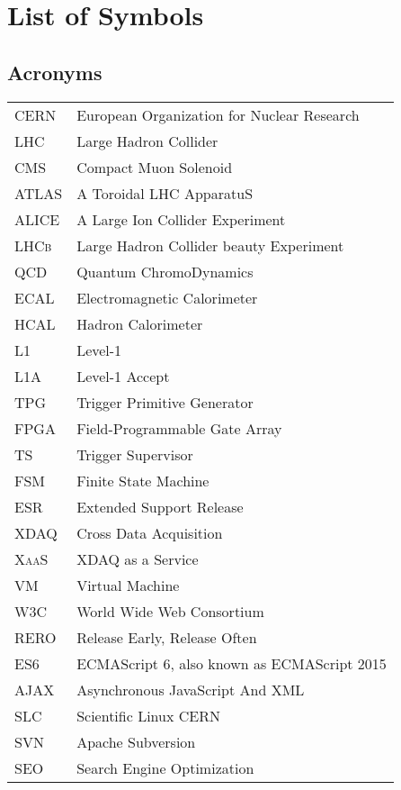 \chapter*{List of Symbols}





\section*{Acronyms}

\begin{longtable}{ll}
\textsc{CERN}	& European Organization for Nuclear Research\\
\textsc{LHC}	& Large Hadron Collider\\
\textsc{CMS}	& Compact Muon Solenoid\\
\textsc{ATLAS}	& A Toroidal LHC ApparatuS\\
\textsc{ALICE}	& A Large Ion Collider Experiment\\
\textsc{LHCb}	& Large Hadron Collider beauty Experiment\\
\textsc{QCD}	& Quantum ChromoDynamics\\
\textsc{ECAL}	& Electromagnetic Calorimeter\\
\textsc{HCAL}	& Hadron Calorimeter\\
\textsc{L1}	& Level-1\\
\textsc{L1A}	& Level-1 Accept\\
\textsc{TPG}	& Trigger Primitive Generator\\
\textsc{FPGA}	& Field-Programmable Gate Array\\
\textsc{TS}	& Trigger Supervisor\\
\textsc{FSM}	& Finite State Machine\\
\textsc{ESR}	& Extended Support Release\\
\textsc{XDAQ}	& Cross Data Acquisition\\
\textsc{XaaS}	& XDAQ as a Service\\
\textsc{VM}	& Virtual Machine\\
\textsc{W3C}	& World Wide Web Consortium\\
\textsc{RERO}	& Release Early, Release Often\\
\textsc{ES6}	& ECMAScript 6, also known as ECMAScript 2015\\
\textsc{AJAX}	& Asynchronous JavaScript And XML\\
\textsc{SLC}	& Scientific Linux CERN\\
\textsc{SVN}	& Apache Subversion\\
\textsc{SEO}	& Search Engine Optimization\\
\end{longtable}
